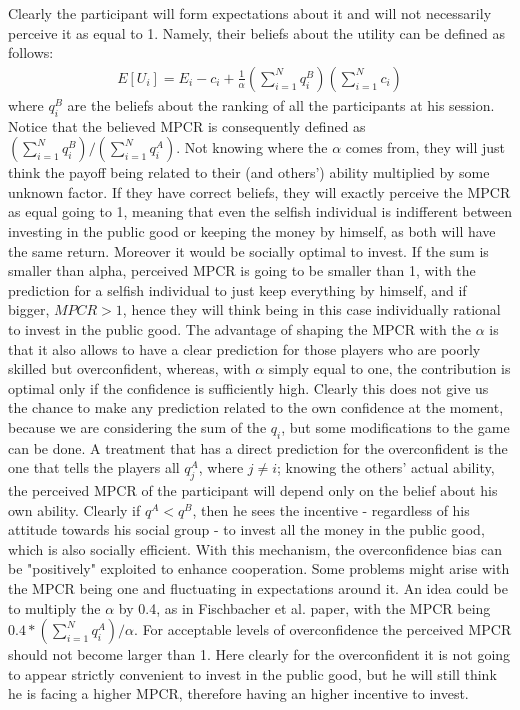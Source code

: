 \documentclass[11pt,twoside,a4paper,leqno]{article}
\begin{document}
Clearly the participant will form expectations about it and will not necessarily perceive it as equal to 1. Namely, their beliefs about the utility can be defined as follows:
\begin{align}
	E[U_{i}] = E_{i} - c_{i} + \frac{1}{\alpha}(\sum_{i=1}^N q_{i}^B)(\sum_{i=1}^N c_{i})
\end{align}
where $q_{i}^B$ are the beliefs about the ranking of all the participants at his session. Notice that the believed MPCR is consequently defined as $(\sum_{i=1}^N q_{i}^B)/(\sum_{i=1}^N q_{i}^A)$. Not knowing where the $\alpha$ comes from, they will just think the payoff being related to their (and others') ability multiplied by some unknown factor. If they have correct beliefs, they will exactly perceive the MPCR as equal going to 1, meaning that even the selfish individual is indifferent between investing in the public good or keeping the money by himself, as both will have the same return. Moreover it would be socially optimal to invest. If the sum is smaller than alpha, perceived MPCR is going to be smaller than 1, with the prediction for a selfish individual to just keep everything by himself, and if bigger, $MPCR > 1$, hence they will think being in this case individually rational to invest in the public good. The advantage of shaping the MPCR with the $\alpha$ is that it also allows to have a clear prediction for those players who are poorly skilled but overconfident, whereas, with $\alpha$ simply equal to one, the contribution is optimal only if the confidence is sufficiently high. Clearly this does not give us the chance to make any prediction related to the own confidence at the moment, because we are considering the sum of the $q_{i}$, but some modifications to the game can be done. A treatment that has a direct prediction for the overconfident is the one that tells the players all $q_{j}^A$, where $j \neq i$; knowing the others' actual ability, the perceived MPCR of the participant will depend only on the belief about his own ability. Clearly if $q^A < q^B$, then he sees the incentive - regardless of his attitude towards his social group - to invest all the money in the public good, which is also socially efficient. With this mechanism, the overconfidence bias can be "positively" exploited to enhance cooperation. \newline
Some problems might arise with the MPCR being one and fluctuating in expectations around it. An idea could be to multiply the $\alpha$ by 0.4, as in Fischbacher et al. paper\textsuperscript{\cite{Fisch}}, with the MPCR being $0.4*(\sum_{i=1}^N q_{i}^A)/\alpha$. For acceptable levels of overconfidence the perceived MPCR should not become larger than 1. Here clearly for the overconfident it is not going to appear strictly convenient to invest in the public good, but he will still think he is facing a higher MPCR, therefore having an higher incentive to invest.\newline
\end{document}
